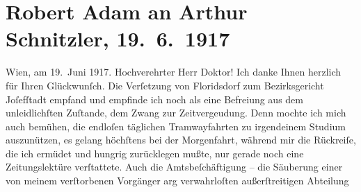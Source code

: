 

         
         \renewcommand{\erwaehntePersonen}{Personen: Richard Beer, Alexandre père Dumas, Aemilius Hacker, Viktor Franz Patzner, Maria Pollak}
         \renewcommand{\erwaehnteInstitutionen}{Institutionen: Bezirksgericht Wien Josefstadt}
         \renewcommand{\erwaehnteOrte}{Orte: Steiermark, VIII., Josefstadt, Wien, XXI., Floridsdorf, Zistersdorf}
         \renewcommand{\erwaehnteWerke}{Werke: Das Ende des Judas, Meine Memoiren}
               \section[Robert Adam an Arthur Schnitzler, 19. 6. 1917]{ Robert Adam an Arthur Schnitzler, 19. 6. 1917}\nopagebreak{}\rehead{ }\begin{ledgroupsized}[t]{13cm}\normalsize\beginnumbering \toendnotes[C]{\smallbreak\pagebreak[2]} 
\toendnotes[C]{\smallbreak}\pstart
           \raggedleft{}{\pb}Wien, am 19. Juni 1917. \pend
           \pstart{}Hochverehrter Herr Doktor!\pend\pstart
           Ich danke Ihnen herzlich für Ihren Glückwunſch. Die Verſetzung von Floridsdorf zum Bezirksgericht Joſefſtadt empfand und empfinde ich noch als eine Befreiung aus dem unleidlichſten
                    Zuſtande, dem Zwang zur Zeitvergeudung. Denn mochte ich mich auch bemühen, die
                    endloſen täglichen Tramwayfahrten zu irgendeinem Studium auszunützen, es gelang
                    höchſtens bei der Morgenfahrt, während mir die Rückreiſe, die ich ermüdet und
                    hungrig zurücklegen mußte, nur gerade noch eine Zeitungslektüre {\pb}verſtattete. Auch die Amtsbeſchäftigung – die
                    Säuberung einer von meinem verſtorbenen Vorgänger arg verwahrloſten außerſtreitigen Abteilung

\end{ledgroupsized}
